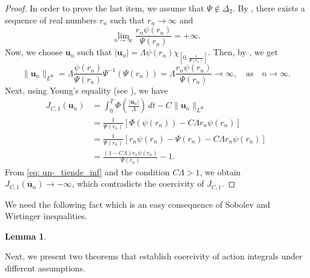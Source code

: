\documentclass[twoside]{article}
\newtheorem{lem}[thm]{Lemma}
\theoremstyle{remark}
\newcommand{\orlnor}{\|_{L^{\Phi}}}
\renewcommand{\b}[1]{\boldsymbol{#1}}
\begin{document}
\begin{proof}
In order to prove the last item, we assume that $\Psi \notin \Delta_2$. 
By \cite[Thm. 4.1]{KR},  there exists a sequence of real  numbers  $r_n$ such that
$r_n \to \infty$ and 
\begin{equation}\label{eq: un-_tiende_inf}
\lim\limits_{n \to \infty} \frac{r_n \psi(r_n)}{\Psi(r_n)}=+\infty.
\end{equation}
Now, we choose $\b{u}_n$ such that
$|\b{u}_n|=\Lambda\psi(r_n)\chi_{[0,\frac{1}{\Psi(r_n)}]}$. Then, 
by \cite[Eq. (9.11)]{KR}, we get 
\[
\|\b{u}_n\orlnor =\Lambda\frac{\psi(r_n)}{\Psi(r_n)}\Psi^{-1}(\Psi(r_n))=
\Lambda\frac{r_n\psi(r_n)}{\Psi(r_n)}\to \infty,\quad\text{as}\quad n \to \infty.
\]
Next, using Young's equality (see \cite[Eq. (2.7)]{KR}), we have
\[
\begin{split}
J_{C,1}(\b{u}_n)&=\int_0^T \Phi\left(\frac{|\b{u}_n|}{\Lambda}\right)\,dt-C\|\b{u}_n\orlnor\\
&=
\frac{1}{\Psi(r_n)}\left[\Phi(\psi(r_n))  -C\Lambda r_n\psi(r_n)\right]\\
&=
\frac{1}{\Psi(r_n)} \left[ r_n\psi(r_n)-\Psi(r_n)- C\Lambda r_n\psi(r_n) \right]\\
&=\frac{(1- C\Lambda) r_n\psi(r_n)}{\Psi(r_n)}-1.
\end{split}
\]
From \eqref{eq: un-_tiende_inf} and the condition $C\Lambda>1$, we obtain  $J_{C,1}(\b{u}_n)\to-\infty$, which contradicts the coercivity  of $J_{C,1}$.
\end{proof}

We need the following fact which is an easy consequence of Sobolev and Wirtinger inequalities.

\begin{lem} 
\end{lem}















Next, we present two theorems that establish coercivity of action integrals under different assumptions. 
\end{document}
